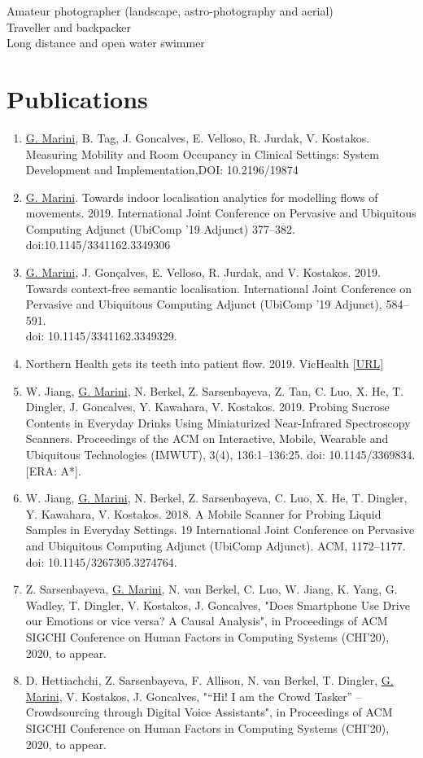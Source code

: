 \documentclass[margin]{res}
\begin{document}
\begin{resume}
\textbullet{} Amateur photographer (landscape, astro-photography and aerial)\\
\textbullet{} Traveller and backpacker\\
\textbullet{} Long distance and open water swimmer\\


\section{Publications}
%
%     
\begin{enumerate}[leftmargin=0pt]
    \item  \underline{G. Marini}, B. Tag, J. Goncalves, E. Velloso, R. Jurdak, V. Kostakos. Measuring Mobility and Room Occupancy in Clinical Settings: System Development and Implementation,DOI: 10.2196/19874
    \item  \underline{G. Marini}. Towards indoor localisation analytics for modelling flows of movements. 2019. International Joint Conference on Pervasive and Ubiquitous Computing Adjunct (UbiComp '19 Adjunct) 377–382. doi:10.1145/3341162.3349306
     \item \underline{G. Marini}, J. Gonçalves, E. Velloso, R. Jurdak, and V. Kostakos. 2019. Towards context-free semantic localisation. International Joint Conference on Pervasive and Ubiquitous Computing Adjunct (UbiComp '19 Adjunct), 584–591.\\ doi: 10.1145/3341162.3349329.
     \item Northern Health gets its teeth into patient flow. 2019. VicHealth  [\href{http://www.health.vic.gov.au/healthvictoria/jul19/flow.htm}{URL}]
    \item W. Jiang, \underline{G. Marini}, N. Berkel, Z. Sarsenbayeva, Z. Tan, C. Luo, X. He, T. Dingler, J. Goncalves, Y. Kawahara, V. Kostakos. 2019. Probing Sucrose Contents in Everyday Drinks Using Miniaturized Near-Infrared Spectroscopy Scanners. Proceedings of the ACM on Interactive, Mobile, Wearable and Ubiquitous Technologies (IMWUT), 3(4), 136:1–136:25. doi: 10.1145/3369834. [ERA: A*].
    \item  W. Jiang, \underline{G. Marini}, N. Berkel, Z. Sarsenbayeva, C. Luo, X. He, T. Dingler, Y. Kawahara, V. Kostakos. 2018. A Mobile Scanner for Probing Liquid Samples in Everyday Settings. 19 International Joint Conference on Pervasive and Ubiquitous Computing Adjunct (UbiComp Adjunct). ACM, 1172–1177. doi: 10.1145/3267305.3274764.
    \item Z. Sarsenbayeva, \underline{G. Marini}, N. van Berkel, C. Luo, W. Jiang, K. Yang, G. Wadley, T. Dingler, V. Kostakos, J. Goncalves, "Does Smartphone Use Drive our Emotions or vice versa? A Causal Analysis", in Proceedings of ACM SIGCHI Conference on Human Factors in Computing Systems (CHI’20), 2020, to appear.   
    \item D. Hettiachchi, Z. Sarsenbayeva, F. Allison, N. van Berkel, T. Dingler, \underline{G. Marini}, V. Kostakos, J. Goncalves, "“Hi! I am the Crowd Tasker” – Crowdsourcing through Digital Voice Assistants", in Proceedings of ACM SIGCHI Conference on Human Factors in Computing Systems (CHI’20), 2020, to appear.   


\end{enumerate}
\end{resume}
\end{document}
